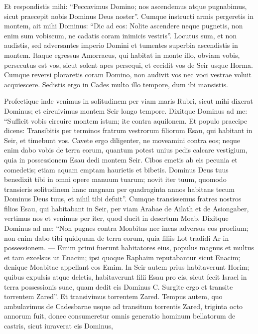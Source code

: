 \begin{biblechapter}
 \verse Et respondistis mihi: “Peccavimus Domino; nos ascendemus atque pugnabimus, sicut praecepit nobis Dominus Deus noster”. Cumque instructi armis pergeretis in montem, 
\verse ait mihi Dominus: “Dic ad eos: Nolite ascendere neque pugnetis, non enim sum vobiscum, ne cadatis coram inimicis vestris”. 
\verse Locutus sum, et non audistis, sed adversantes imperio Domini et tumentes superbia ascendistis in montem. 
\verse Itaque egressus Amorraeus, qui habitat in monte illo, obviam vobis, persecutus est vos, sicut solent apes persequi, et cecidit vos de Seir usque Horma. 
\verse Cumque reversi ploraretis coram Domino, non audivit vos nec voci vestrae voluit acquiescere. 
\verse Sedistis ergo in Cades multo illo tempore, dum ibi mansistis.
 
\begin{biblechapter}
\verse Profectique inde venimus in solitudinem per viam maris Rubri, sicut mihi dixerat Dominus; et circuivimus montem Seir longo tempore. 
\verse Dixitque Dominus ad me: 
\verse “Sufficit vobis circuire montem istum; ite contra aquilonem. 
\verse Et populo praecipe dicens: Transibitis per terminos fratrum vestrorum filiorum Esau, qui habitant in Seir, et timebunt vos. 
\verse Cavete ergo diligenter, ne moveamini contra eos; neque enim dabo vobis de terra eorum, quantum potest unius pedis calcare vestigium, quia in possessionem Esau dedi montem Seir. 
\verse Cibos emetis ab eis pecunia et comedetis; etiam aquam emptam haurietis et bibetis. 
 \verse Dominus Deus tuus benedixit tibi in omni opere manuum tuarum; novit iter tuum, quomodo transieris solitudinem hanc magnam per quadraginta annos habitans tecum Dominus Deus tuus, et nihil tibi defuit”.
 \verse Cumque transissemus fratres nostros filios Esau, qui habitabant in Seir, per viam Arabae de Ailath et de Asiongaber, vertimus nos et venimus per iter, quod ducit in desertum Moab. 
\verse Dixitque Dominus ad me: “Non pugnes contra Moabitas nec ineas adversus eos proelium; non enim dabo tibi quidquam de terra eorum, quia filiis Lot tradidi Ar in possessionem. 
\verse — Emim primi fuerunt habitatores eius, populus magnus et multus et tam excelsus ut Enacim; 
\verse ipsi quoque Raphaim reputabantur sicut Enacim; denique Moabitae appellant eos Emim. 
\verse In Seir autem prius habitaverunt Horim; quibus expulsis atque deletis, habitaverunt filii Esau pro eis, sicut fecit Israel in terra possessionis suae, quam dedit eis Dominus C. 
\verse Surgite ergo et transite torrentem Zared”. Et transivimus torrentem Zared.
 \verse Tempus autem, quo ambulavimus de Cadesbarne usque ad transitum torrentis Zared, triginta octo annorum fuit, donec consumeretur omnis generatio hominum bellatorum de castris, sicut iuraverat eis Dominus, 

\end{biblechapter}
\end{biblechapter}
